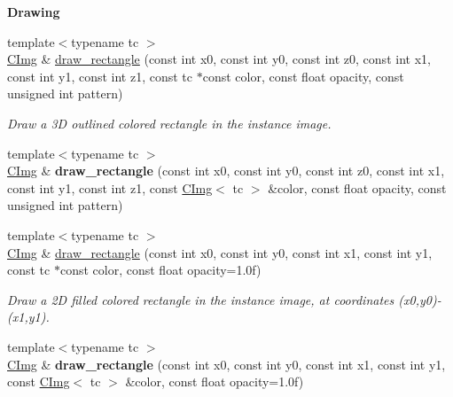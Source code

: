 \begin{Indent}{\bf Drawing}
\begin{DoxyCompactItemize}
\item 
\hypertarget{structcimg__library_1_1_c_img_af855c100ffc67a63f0098584e76b40fd}{{\footnotesize template$<$typename tc $>$ }\\\hyperlink{structcimg__library_1_1_c_img}{C\-Img} \& \hyperlink{structcimg__library_1_1_c_img_af855c100ffc67a63f0098584e76b40fd}{draw\-\_\-rectangle} (const int x0, const int y0, const int z0, const int x1, const int y1, const int z1, const tc $\ast$const color, const float opacity, const unsigned int pattern)}\label{structcimg__library_1_1_c_img_af855c100ffc67a63f0098584e76b40fd}

\begin{DoxyCompactList}\small\item\em Draw a 3\-D outlined colored rectangle in the instance image. \end{DoxyCompactList}\item 
\hypertarget{structcimg__library_1_1_c_img_af5ba4a8a15a338ea9ecb1496b92ad7a0}{{\footnotesize template$<$typename tc $>$ }\\\hyperlink{structcimg__library_1_1_c_img}{C\-Img} \& {\bfseries draw\-\_\-rectangle} (const int x0, const int y0, const int z0, const int x1, const int y1, const int z1, const \hyperlink{structcimg__library_1_1_c_img}{C\-Img}$<$ tc $>$ \&color, const float opacity, const unsigned int pattern)}\label{structcimg__library_1_1_c_img_af5ba4a8a15a338ea9ecb1496b92ad7a0}

\item 
{\footnotesize template$<$typename tc $>$ }\\\hyperlink{structcimg__library_1_1_c_img}{C\-Img} \& \hyperlink{structcimg__library_1_1_c_img_a35f4b235b78cb494ffdb5139a2825733}{draw\-\_\-rectangle} (const int x0, const int y0, const int x1, const int y1, const tc $\ast$const color, const float opacity=1.\-0f)
\begin{DoxyCompactList}\small\item\em Draw a 2\-D filled colored rectangle in the instance image, at coordinates ({\ttfamily x0},{\ttfamily y0})-\/({\ttfamily x1},{\ttfamily y1}). \end{DoxyCompactList}\item 
\hypertarget{structcimg__library_1_1_c_img_a9b092b3f4daf02f61a28a9a82f8c0969}{{\footnotesize template$<$typename tc $>$ }\\\hyperlink{structcimg__library_1_1_c_img}{C\-Img} \& {\bfseries draw\-\_\-rectangle} (const int x0, const int y0, const int x1, const int y1, const \hyperlink{structcimg__library_1_1_c_img}{C\-Img}$<$ tc $>$ \&color, const float opacity=1.\-0f)}\label{structcimg__library_1_1_c_img_a9b092b3f4daf02f61a28a9a82f8c0969}


\end{DoxyCompactItemize}
\end{Indent}
